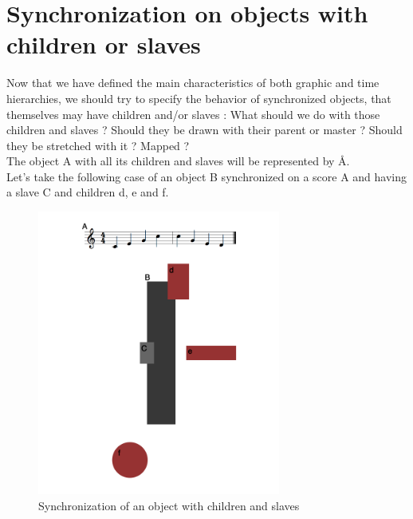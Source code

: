 \documentclass[a4paper]{article}
\begin{document}
\section{Synchronization on objects with children or slaves}\label{sec:sync_children}

Now that we have defined the main characteristics of both graphic and time hierarchies, we should try to specify the behavior of synchronized objects, that themselves may have children and/or slaves : What should we do with those children and slaves ? Should they be drawn with their parent or master ? Should they be stretched with it ? Mapped ?
\\

The object A with all its children and slaves will be represented by \r{A}.
\\

Let's take the following case of an object B synchronized on a score A and having a slave C and children d, e and f. 
\\
\begin{figure}[h]
\centering
\includegraphics[width=8cm]{img/score.png}   	            
\caption{Synchronization of an object with children and slaves}
\label{fig:defaultMap}
\end{figure}

\begin{center}
\end{center}
\end{document}
